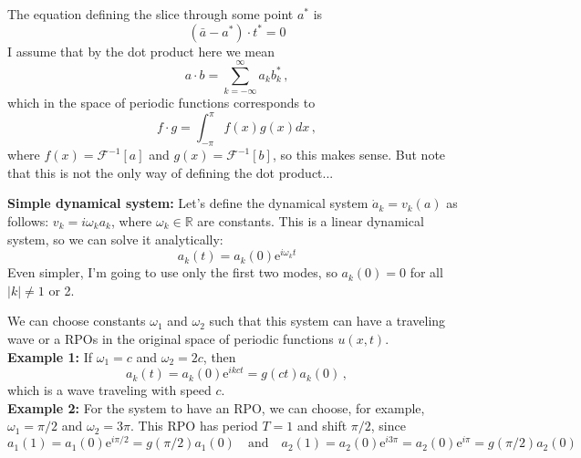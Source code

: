 \documentclass[letter,10pt]{article}
\begin{document}
The equation defining the slice through some point $a^*$ is
\[ (\bar{a} - a^*) \cdot t^* = 0 \]
I assume that by the dot product here we mean
\[ a \cdot b = \sum_{k=-\infty}^\infty a_k b_k^*\,, \]
which in the space of periodic functions corresponds to
\[ f \cdot g = \int_{-\pi}^\pi f(x) g(x) dx\,, \]
where $f(x) = \mathcal{F}^{-1}[a]$ and $g(x) = \mathcal{F}^{-1}[b]$, so this makes sense.  But note that this is not the only way of defining the dot product...

{\bf Simple dynamical system:}
Let's define the dynamical system $\dot{a}_k = v_k(a)$ as follows: $v_k = i \omega_k a_k$,
where $\omega_k \in \mathbb{R}$ are constants.
This is a linear dynamical system, so we can solve it analytically:
\[ a_k(t) = a_k(0) \mathrm{e}^{i \omega_k t} \]
Even simpler, I'm going to use only the first two modes, so $a_k(0) = 0$ for all $|k| \neq 1$ or 2.

We can choose constants $\omega_1$ and $\omega_2$ such that this system can have
a traveling wave or a RPOs in the original space of periodic functions $u(x,t)$.\\
{\bf Example 1:} If $\omega_1 = c$ and $\omega_2 = 2c$, then
\[ a_k(t) = a_k(0) \mathrm{e}^{ikct} = g(ct) a_k(0)\,, \]
which is a wave traveling with speed $c$.\\
{\bf Example 2:} For the system to have an RPO, we can choose, for example,
$\omega_1 = \pi/2$ and $\omega_2 = 3\pi$.  This RPO has period $T = 1$ and shift $\pi/2$, since
\[ a_1(1) = a_1(0) \mathrm{e}^{i\pi/2} = g(\pi/2) a_1(0) \quad \mathrm{and} \quad
   a_2(1) = a_2(0) \mathrm{e}^{i3\pi} = a_2(0) \mathrm{e}^{i\pi} = g(\pi/2) a_2(0) \]
\end{document}
